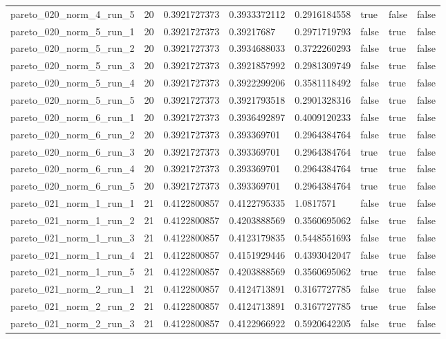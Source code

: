 \begin{tabular}{@{}llllllll@{}}
pareto\_020\_norm\_4\_run\_5 & 20 & 0.3921727373 & 0.3933372112 & 0.2916184558 & true & false & false \\
pareto\_020\_norm\_5\_run\_1 & 20 & 0.3921727373 & 0.39217687 & 0.2971719793 & false & true & false \\
pareto\_020\_norm\_5\_run\_2 & 20 & 0.3921727373 & 0.3934688033 & 0.3722260293 & false & true & false \\
pareto\_020\_norm\_5\_run\_3 & 20 & 0.3921727373 & 0.3921857992 & 0.2981309749 & false & true & false \\
pareto\_020\_norm\_5\_run\_4 & 20 & 0.3921727373 & 0.3922299206 & 0.3581118492 & false & true & false \\
pareto\_020\_norm\_5\_run\_5 & 20 & 0.3921727373 & 0.3921793518 & 0.2901328316 & false & true & false \\
pareto\_020\_norm\_6\_run\_1 & 20 & 0.3921727373 & 0.3936492897 & 0.4009120233 & false & true & false \\
pareto\_020\_norm\_6\_run\_2 & 20 & 0.3921727373 & 0.393369701 & 0.2964384764 & false & true & false \\
pareto\_020\_norm\_6\_run\_3 & 20 & 0.3921727373 & 0.393369701 & 0.2964384764 & true & true & false \\
pareto\_020\_norm\_6\_run\_4 & 20 & 0.3921727373 & 0.393369701 & 0.2964384764 & true & true & false \\
pareto\_020\_norm\_6\_run\_5 & 20 & 0.3921727373 & 0.393369701 & 0.2964384764 & true & true & false \\
pareto\_021\_norm\_1\_run\_1 & 21 & 0.4122800857 & 0.4122795335 & 1.0817571 & false & true & false \\
pareto\_021\_norm\_1\_run\_2 & 21 & 0.4122800857 & 0.4203888569 & 0.3560695062 & false & true & false \\
pareto\_021\_norm\_1\_run\_3 & 21 & 0.4122800857 & 0.4123179835 & 0.5448551693 & false & true & false \\
pareto\_021\_norm\_1\_run\_4 & 21 & 0.4122800857 & 0.4151929446 & 0.4393042047 & false & true & false \\
pareto\_021\_norm\_1\_run\_5 & 21 & 0.4122800857 & 0.4203888569 & 0.3560695062 & true & true & false \\
pareto\_021\_norm\_2\_run\_1 & 21 & 0.4122800857 & 0.4124713891 & 0.3167727785 & false & true & false \\
pareto\_021\_norm\_2\_run\_2 & 21 & 0.4122800857 & 0.4124713891 & 0.3167727785 & true & true & false \\
pareto\_021\_norm\_2\_run\_3 & 21 & 0.4122800857 & 0.4122966922 & 0.5920642205 & false & true & false \\

\end{tabular}

